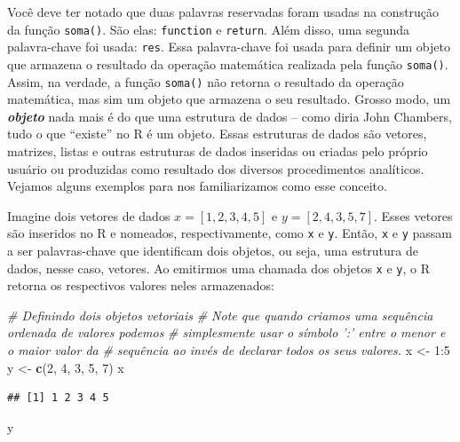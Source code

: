 \documentclass[]{book}
\newenvironment{Shaded}{\begin{snugshade}}{\end{snugshade}}
\newcommand{\KeywordTok}[1]{\textcolor[rgb]{0.13,0.29,0.53}{\textbf{{#1}}}}
\newcommand{\DecValTok}[1]{\textcolor[rgb]{0.00,0.00,0.81}{{#1}}}
\newcommand{\StringTok}[1]{\textcolor[rgb]{0.31,0.60,0.02}{{#1}}}
\newcommand{\CommentTok}[1]{\textcolor[rgb]{0.56,0.35,0.01}{\textit{{#1}}}}
\newcommand{\NormalTok}[1]{{#1}}
\begin{document}
Você deve ter notado que duas palavras reservadas foram usadas na
construção da função \texttt{soma()}. São elas: \texttt{function} e
\texttt{return}. Além disso, uma segunda palavra-chave foi usada:
\texttt{res}. Essa palavra-chave foi usada para definir um objeto que
armazena o resultado da operação matemática realizada pela função
\texttt{soma()}. Assim, na verdade, a função \texttt{soma()} não retorna
o resultado da operação matemática, mas sim um objeto que armazena o seu
resultado. Grosso modo, um \textbf{\emph{objeto}} nada mais é do que uma
estrutura de dados -- como diria John Chambers, tudo o que ``existe'' no
R é um objeto. Essas estruturas de dados são vetores, matrizes, listas e
outras estruturas de dados inseridas ou criadas pelo próprio usuário ou
produzidas como resultado dos diversos procedimentos analíticos. Vejamos
alguns exemplos para nos familiarizamos como esse conceito.

Imagine dois vetores de dados \(x = [1, 2, 3, 4, 5]\) e
\(y = [2, 4, 3, 5, 7]\). Esses vetores são inseridos no R e nomeados,
respectivamente, como \texttt{x} e \texttt{y}. Então, \texttt{x} e
\texttt{y} passam a ser palavras-chave que identificam dois objetos, ou
seja, uma estrutura de dados, nesse caso, vetores. Ao emitirmos uma
chamada dos objetos \texttt{x} e \texttt{y}, o R retorna os respectivos
valores neles armazenados:

\begin{Shaded}
\begin{Highlighting}[]
\CommentTok{# Definindo dois objetos vetoriais}
\CommentTok{# Note que quando criamos uma sequência ordenada de valores podemos }
\CommentTok{# simplesmente usar o símbolo ':' entre o menor e o maior valor da }
\CommentTok{# sequência ao invés de declarar todos os seus valores.}
\NormalTok{x <-}\StringTok{ }\DecValTok{1}\NormalTok{:}\DecValTok{5}
\NormalTok{y <-}\StringTok{ }\KeywordTok{c}\NormalTok{(}\DecValTok{2}\NormalTok{, }\DecValTok{4}\NormalTok{, }\DecValTok{3}\NormalTok{, }\DecValTok{5}\NormalTok{, }\DecValTok{7}\NormalTok{)}
\NormalTok{x}
\end{Highlighting}
\end{Shaded}

\begin{verbatim}
## [1] 1 2 3 4 5
\end{verbatim}

\begin{Shaded}
\begin{Highlighting}[]
\NormalTok{y}
\end{Highlighting}
\end{Shaded}
\end{document}

